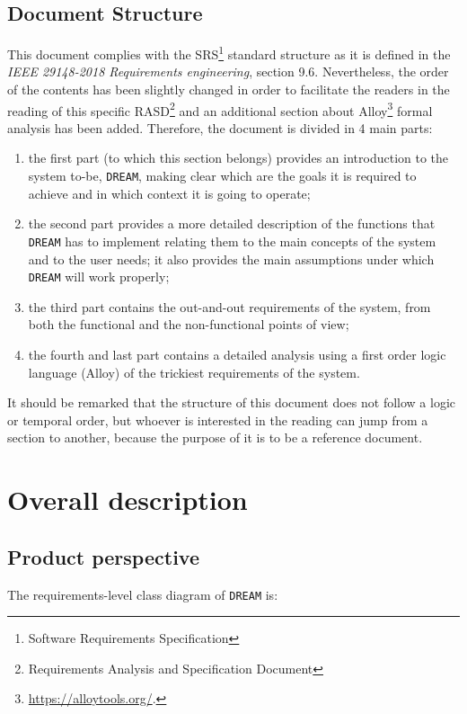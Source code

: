 \documentclass{article}
\begin{document}
\subsection{Document Structure}
This document complies with the SRS\footnote{Software Requirements Specification} standard structure as it is defined in the \textit{IEEE 29148-2018 Requirements engineering}, section 9.6. Nevertheless, the order of the contents has been slightly changed in order to facilitate the readers in the reading of this specific RASD\footnote{Requirements Analysis and Specification Document} and an additional section about Alloy\footnote{\url{https://alloytools.org/}.} formal analysis has been added.
Therefore, the document is divided in 4 main parts:
\begin{enumerate}
\item the first part (to which this section belongs) provides an introduction to the system to-be, \verb|DREAM|, making clear which are the goals it is required to achieve and in which context it is going to operate;
\item the second part provides a more detailed description of the functions that \verb|DREAM| has to implement relating them to the main concepts of the system and to the user needs; it also provides the main assumptions under which \verb|DREAM| will work properly;

\item the third part contains the out-and-out requirements of the system, from both the functional and the non-functional points of view;
\item the fourth and last part contains a detailed analysis using a first order logic language (Alloy) of the trickiest requirements of the system.
\end{enumerate}
It should be remarked that the structure of this document does not follow a logic or temporal order, but whoever is interested in the reading can jump from a section to another, because the purpose of it is to be a reference document.
\newpage
\section{Overall description}
\subsection{Product perspective}
The requirements-level class diagram of \verb|DREAM| is:
\end{document}
